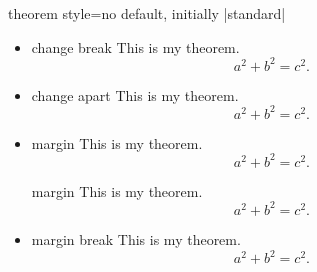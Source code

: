 \begin{docTcbKey}{theorem style}{=}{no default, initially |standard|}
\begin{itemize}
\begin{dispExample}
\begin{theorem}[theorem style=change]{change}{}
This is my theorem. \begin{equation*} a^2 + b^2 = c^2. \end{equation*}
\end{theorem}
\end{dispExample}
%
\item{}
\begin{dispExample}
\begin{theorem}[theorem style=change break]{change break}{}
This is my theorem. \begin{equation*} a^2 + b^2 = c^2. \end{equation*}
\end{theorem}
\end{dispExample}
%
\item{}
\begin{dispExample}
\begin{theorem}[theorem style=change apart]{change apart}{}
This is my theorem. \begin{equation*} a^2 + b^2 = c^2. \end{equation*}
\end{theorem}
\end{dispExample}
%
\clearpage
\item{}
\begin{dispExample}
\begin{theorem}[theorem style=margin,left=10mm]{margin}{}
This is my theorem. \begin{equation*} a^2 + b^2 = c^2. \end{equation*}
\end{theorem}
\begin{theorem}[theorem style=margin,left=10mm,oversize]{margin}{}
This is my theorem. \begin{equation*} a^2 + b^2 = c^2. \end{equation*}
\end{theorem}
\end{dispExample}
%
\item{}
\begin{dispExample}
\begin{theorem}[theorem style=margin break,left=10mm]{margin break}{}
This is my theorem. \begin{equation*} a^2 + b^2 = c^2. \end{equation*}

\end{theorem}
\end{dispExample}
\end{itemize}
\end{docTcbKey}
